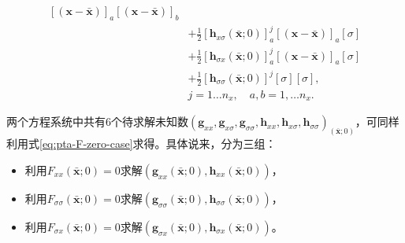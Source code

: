 \begin{enumerate}
\begin{equation}
\begin{split}
      \left[ \left( \bm{x} - \bar{\bm{x}} \right) \right]_{a}
      \left[ \left( \bm{x} - \bar{\bm{x}} \right) \right]_{b} \\
      &+\frac{1}{2}
      \left[ \bm{h}_{x \sigma} (\bar{\bm{x}};0) \right]^{j}_{a}
      \left[ \left( \bm{x} - \bar{\bm{x}} \right) \right]_{a}
      \left[ \sigma \right] \\
      &+ \frac{1}{2}
      \left[ \bm{h}_{\sigma x } (\bar{\bm{x}};0) \right]^{j}_{a}
      \left[ \left( \bm{x} - \bar{\bm{x}} \right) \right]_{a}
      \left[ \sigma \right] \\
      &+ \frac{1}{2}
      \left[ \bm{h}_{\sigma \sigma} (\bar{\bm{x}};0) \right]^{j}
      \left[ \sigma \right]
      \left[ \sigma \right],\\
      &j=1\ldots n_x, \quad a,b=1,\ldots n_x.
    \end{split}
  \end{equation}
\end{enumerate}

两个方程系统中共有6个待求解未知数$\left( \bm{g}_{xx}, \bm{g}_{x \sigma}, \bm{g}_{\sigma \sigma} , \bm{h}_{xx}, \bm{h}_{x \sigma}, \bm{h}_{\sigma \sigma}\right)_{(\bar{\bm{x}};0)}$，可同样利用式\eqref{eq:pta-F-zero-case}求得。具体说来，分为三组：
\begin{itemize}
\item 利用$F_{xx}(\bar{\bm{x}};0) = 0$求解$\left( \bm{g}_{xx}(\bar{\bm{x}};0), \bm{h}_{xx}(\bar{\bm{x}};0) \right)$，
\item 利用$F_{\sigma \sigma}(\bar{\bm{x}};0) = 0$求解$\left( \bm{g}_{\sigma \sigma}(\bar{\bm{x}};0), \bm{h}_{\sigma \sigma}(\bar{\bm{x}};0) \right)$，
\item 利用$F_{\sigma x}(\bar{\bm{x}};0) = 0$求解$\left( \bm{g}_{\sigma x}(\bar{\bm{x}};0), \bm{h}_{\sigma x}(\bar{\bm{x}};0) \right)$。
\end{itemize}

